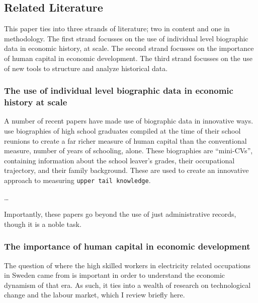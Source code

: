 \documentclass[
]{article}
\begin{document}
\hypertarget{related-literature}{%
\subsection{Related Literature}\label{related-literature}}

This paper ties into three strands of literature; two in content and one
in methodology. The first strand focusses on the use of individual level
biographic data in economic history, at scale. The second strand
focusses on the importance of human capital in economic development. The
third strand focusses on the use of new tools to structure and analyze
historical data.

\hypertarget{the-use-of-individual-level-biographic-data-in-economic-history-at-scale}{%
\subsubsection{The use of individual level biographic data in economic
history at
scale}\label{the-use-of-individual-level-biographic-data-in-economic-history-at-scale}}

A number of recent papers have made use of biographic data in innovative
ways. \textcite{ford2023not} use biographies of high school graduates
compiled at the time of their school reunions to create a far richer
measure of human capital than the conventional measure, number of years
of schooling, alone. These biographies are ``mini-CVs'', containing
information about the school leaver's grades, their occupational
trajectory, and their family background. These are used to create an
innovative approach to measuring \texttt{upper\ tail\ knowledge}.

\textcite{herstory}\ldots{}

Importantly, these papers go beyond the use of just administrative
records, though it is a noble task.

\hypertarget{the-importance-of-human-capital-in-economic-development}{%
\subsubsection{The importance of human capital in economic
development}\label{the-importance-of-human-capital-in-economic-development}}

The question of where the high skilled workers in electricity related
occupations in Sweden came from is important in order to understand the
economic dynamism of that era. As such, it ties into a wealth of
research on technological change and the labour market, which I review
briefly here.
\end{document}
